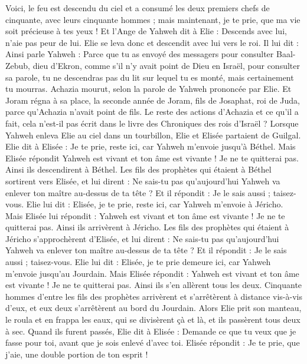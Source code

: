 \begin{multicols}{2}
Voici, le feu est descendu du ciel et a consumé les deux premiers chefs de cinquante, avec leurs cinquante hommes ; mais maintenant, je te prie, que ma vie soit précieuse à tes yeux !
Et l'Ange de Yahweh dit à Elie : Descends avec lui, n'aie pas peur de lui. Elie se leva donc et descendit avec lui vers le roi.
Il lui dit : Ainsi parle Yahweh : Parce que tu as envoyé des messagers pour consulter Baal-Zebub, dieu d'Ekron, comme s'il n'y avait point de Dieu en Israël, pour consulter sa parole, tu ne descendras pas du lit sur lequel tu es monté, mais certainement tu mourras.
Achazia mourut, selon la parole de Yahweh prononcée par Elie. Et Joram régna à sa place, la seconde année de Joram, fils de Josaphat, roi de Juda, parce qu'Achazia n'avait point de fils.
Le reste des actions d'Achazia et ce qu'il a fait, cela n'est-il pas écrit dans le livre des Chroniques des rois d'Israël ?
\VerseOne{}Lorsque Yahweh enleva Elie au ciel dans un tourbillon, Elie et Elisée partaient de Guilgal.
Elie dit à Elisée : Je te prie, reste ici, car Yahweh m'envoie jusqu'à Béthel. Mais Elisée répondit Yahweh est vivant et ton âme est vivante ! Je ne te quitterai pas. Ainsi ils descendirent à Béthel.
Les fils des prophètes qui étaient à Béthel sortirent vers Elisée, et lui dirent : Ne sais-tu pas qu'aujourd'hui Yahweh va enlever ton maître au-dessus de ta tête ? Et il répondit : Je le sais aussi ; taisez-vous.
Elie lui dit : Elisée, je te prie, reste ici, car Yahweh m'envoie à Jéricho. Mais Elisée lui répondit : Yahweh est vivant et ton âme est vivante ! Je ne te quitterai pas. Ainsi ils arrivèrent à Jéricho.
Les fils des prophètes qui étaient à Jéricho s'approchèrent d'Elisée, et lui dirent : Ne sais-tu pas qu'aujourd'hui Yahweh va enlever ton maître au-dessus de ta tête ? Et il répondit : Je le sais aussi ; taisez-vous.
Elie lui dit : Elisée, je te prie demeure ici, car Yahweh m'envoie jusqu'au Jourdain. Mais Elisée répondit : Yahweh est vivant et ton âme est vivante ! Je ne te quitterai pas. Ainsi ils s'en allèrent tous les deux.
Cinquante hommes d'entre les fils des prophètes arrivèrent et s'arrêtèrent à distance vis-à-vis d'eux, et eux deux s'arrêtèrent au bord du Jourdain.
Alors Elie prit son manteau, le roula et en frappa les eaux, qui se divisèrent çà et là, et ils passèrent tous deux à sec.
Quand ils furent passés, Elie dit à Elisée : Demande ce que tu veux que je fasse pour toi, avant que je sois enlevé d'avec toi. Elisée répondit : Je te prie, que j'aie, une double portion de ton esprit !

\end{multicols}
